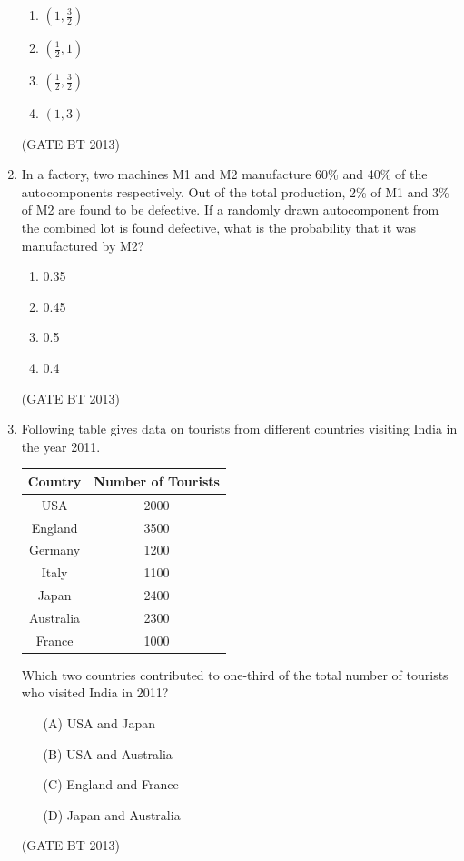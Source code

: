 \documentclass[journal,12pt,onecolumn]{IEEEtran}
\theoremstyle{remark}
\begin{document}
\begin{enumerate}
\begin{enumerate}[label=(\Alph*)]
    \item \((1, \tfrac{3}{2})\)
    \item \(\left(\tfrac{1}{2}, 1\right)\)
    \item \(\left(\tfrac{1}{2}, \tfrac{3}{2}\right)\)
    \item \((1, 3)\)
\end{enumerate} \hfill(GATE BT 2013)

\item 

In a factory, two machines M1 and M2 manufacture 60\% and 40\% of the autocomponents respectively. Out of the total production, 2\% of M1 and 3\% of M2 are found to be defective. If a randomly drawn autocomponent from the combined lot is found defective, what is the probability that it was manufactured by M2?

\begin{enumerate}[label=(\Alph*)]
    \item 0.35
    \item 0.45
    \item 0.5
    \item 0.4
\end{enumerate} \hfill(GATE BT 2013)

\item 
Following table gives data on tourists from different countries visiting India in the year 2011.

\begin{center}
\begin{tabular}{|c|c|}
\hline
\textbf{Country} & \textbf{Number of Tourists} \\
\hline
USA & 2000 \\
England & 3500 \\
Germany & 1200 \\
Italy & 1100 \\
Japan & 2400 \\
Australia & 2300 \\
France & 1000 \\
\hline
\end{tabular}
\end{center}

Which two countries contributed to one-third of the total number of tourists who visited India in 2011?

\begin{enumerate}
    \item[(A)] USA and Japan
    \item[(B)] USA and Australia
    \item[(C)] England and France
    \item[(D)] Japan and Australia
\end{enumerate} \hfill(GATE BT 2013)


\end{enumerate}
\end{document}
